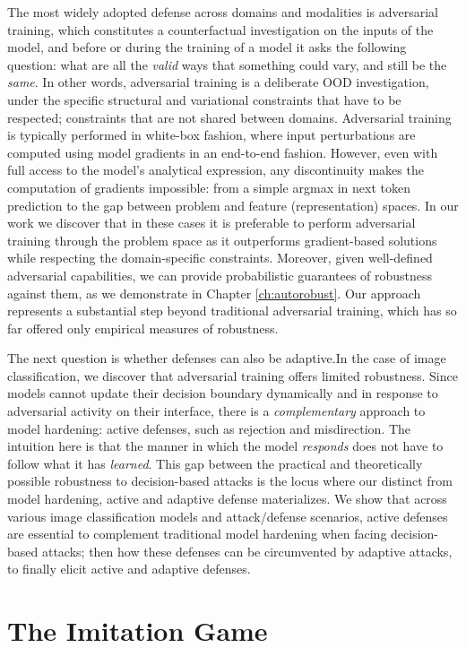 The most widely adopted defense across domains and modalities is adversarial training, which constitutes a counterfactual investigation on the inputs of the model, and before or during the training of a model it asks the following question: what are all the \textit{valid} ways that something could vary, and still be the \textit{same}.
In other words, adversarial training is a deliberate \gls{OOD} investigation, under the specific structural and variational constraints that have to be respected; constraints that are not shared between domains.
Adversarial training is typically performed in white-box fashion, where input perturbations are computed using model gradients in an end-to-end fashion.
However, even with full access to the model’s analytical expression, any discontinuity makes the computation of gradients impossible: from a simple argmax in next token prediction to the gap between problem and feature (representation) spaces.
In our work we discover that in these cases it is preferable to perform adversarial training through the problem space as it outperforms gradient-based solutions while respecting the domain-specific constraints.
Moreover, given well-defined adversarial capabilities, we can provide probabilistic guarantees of robustness against them, as we demonstrate in Chapter \ref{ch:autorobust}.
Our approach represents a substantial step beyond traditional adversarial training, which has so far offered only empirical measures of robustness.

The next question is whether defenses can also be adaptive.In the case of image classification, we discover that adversarial training offers limited robustness.
Since models cannot update their decision boundary dynamically and in response to adversarial activity on their interface, there is a \textit{complementary} approach to model hardening: active defenses, such as rejection and misdirection.
The intuition here is that the manner in which the model \textit{responds} does not have to follow what it has \textit{learned}.
This gap between the practical and theoretically possible robustness to decision-based attacks is the locus where our distinct from model hardening, active and adaptive defense materializes.
We show that across various image classification models and attack/defense scenarios, active defenses are essential to complement traditional model hardening when facing decision-based attacks; then how these defenses can be circumvented by adaptive attacks, to finally elicit active and adaptive defenses.

\section{The Imitation Game}

